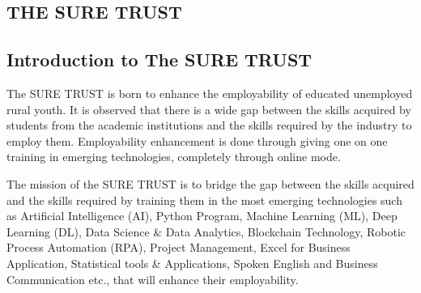 \documentclass[12pt]{article}
\begin{document}
\begin{comment}
{\begin{flushleft}
\begin{figure}[h]
\texttt{[image: radhamam\_sign.png]}
\end{figure}
\textbf{Prof. Ch. Radha Kumari}\\
 Executive Director \& Founder\\
 \textbf{SURE Trust}
\end{flushleft}}
 \hspace{0.6in}
{\begin{flushright}
\begin{figure}[h]
\begin{flushright}
\texttt{[image: radhamam\_sign.png]}
\end{flushright}
\end{figure}
\textbf{Prof. Ch. Radha Kumari}\\
 Executive Director \& Founder\\
 \textbf{SURE Trust}
\end{flushright}}
\end{comment}

\pagebreak
\tableofcontents %
\clearpage

\begin{center}
\section*{\textbf{THE SURE TRUST}}
\end{center}

\subsection*{Introduction to The SURE TRUST}
The SURE TRUST is born to enhance the employability of educated unemployed rural youth. It is
observed that there is a wide gap between the skills acquired by students from the academic
institutions and the skills required by the industry to employ them. Employability enhancement is
done through giving one on one training in emerging technologies, completely through online
mode.

 The mission of the SURE TRUST is to bridge the gap between the skills acquired and the skills
required by training them in the most emerging technologies such as Artificial Intelligence (AI),
Python Program, Machine Learning (ML), Deep Learning (DL), Data Science \& Data Analytics,
Blockchain Technology, Robotic Process Automation (RPA), Project Management, Excel for Business
Application, Statistical tools \& Applications, Spoken English and Business Communication etc., that
will enhance their employability. 
\end{document}
